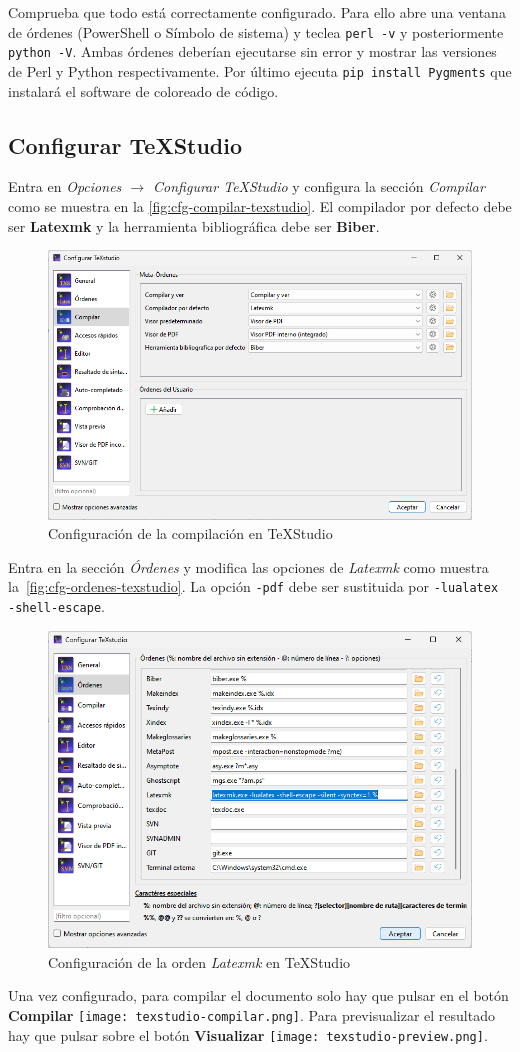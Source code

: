 Comprueba que todo está correctamente configurado.  Para ello abre una ventana de órdenes (PowerShell o Símbolo de sistema) y teclea \texttt{perl -v} y posteriormente \texttt{python -V}. Ambas órdenes deberían ejecutarse sin error y mostrar las versiones de Perl y Python respectivamente. Por último ejecuta \texttt{pip install Pygments} que instalará el software de coloreado de código.

\subsection{Configurar TeXStudio}

Entra en \emph{Opciones $\rightarrow$ Configurar TeXStudio} y configura la sección \emph{Compilar} como se muestra en la \autoref{fig:cfg-compilar-texstudio}. El compilador por defecto debe ser \textbf{Latexmk} y la herramienta bibliográfica debe ser \textbf{Biber}.

\begin{figure}
    \centering
    \includegraphics[width=.7\textwidth]{fig/cfg-texstudio-compilar.png}
    \caption{Configuración de la compilación en TeXStudio}
    \label{fig:cfg-compilar-texstudio}
\end{figure}

Entra en la sección \emph{Órdenes} y modifica las opciones de \emph{Latexmk} como muestra la~\autoref{fig:cfg-ordenes-texstudio}. La opción \texttt{-pdf} debe ser sustituida por \texttt{-lualatex -shell-escape}.

\begin{figure}
    \centering
    \includegraphics[width=.7\textwidth]{fig/cfg-texstudio-ordenes.png}
    \caption{Configuración de la orden \emph{Latexmk} en TeXStudio}
    \label{fig:cfg-ordenes-texstudio}
\end{figure}

Una vez configurado, para compilar el documento solo hay que pulsar en el botón \textbf{Compilar} \texttt{[image: texstudio-compilar.png]}. Para previsualizar el resultado hay que pulsar sobre el botón \textbf{Visualizar} \texttt{[image: texstudio-preview.png]}.